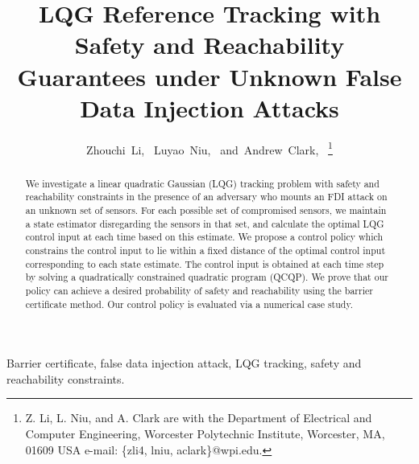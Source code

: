 \documentclass[journal]{IEEEtran}
\begin{document}

\title{LQG Reference Tracking with Safety and Reachability Guarantees under Unknown False Data Injection Attacks} %
                                                
\author{Zhouchi~Li,~
        Luyao~Niu,~
        and~Andrew~Clark,~%
\thanks{Z. Li, L. Niu, and A. Clark are with the Department
of Electrical and Computer Engineering, Worcester Polytechnic Institute, Worcester,
MA, 01609 USA e-mail: \{zli4, lniu, aclark\}@wpi.edu.}}

\maketitle

\begin{abstract}                          %
We investigate a linear quadratic Gaussian (LQG) tracking problem with safety and reachability constraints in the presence of an adversary who mounts an FDI attack on an unknown set of sensors. For each possible set of compromised sensors, we maintain a state estimator disregarding the sensors in that set, and calculate the optimal LQG control input at each time based on this estimate. 
We propose a control policy which constrains the control input to lie within a fixed distance of the optimal control input corresponding to each state estimate. The control input is obtained at each time step by solving a quadratically constrained quadratic program (QCQP). We prove that our policy can achieve a desired probability of safety and reachability using the barrier certificate method. Our control policy is evaluated via a numerical case study.


\end{abstract}

\begin{IEEEkeywords}
Barrier certificate, false data injection attack, LQG tracking, safety and reachability constraints.
\end{IEEEkeywords}
\end{document}
